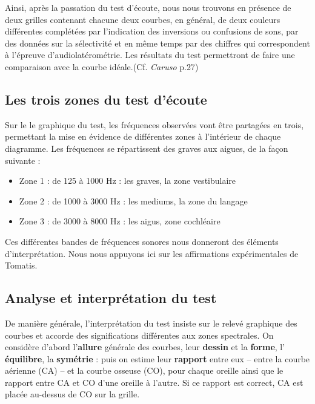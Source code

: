               Ainsi, après la passation du test d\textquoteright écoute, nous nous
trouvons en présence de deux grilles contenant chacune deux courbes,
en général, de deux couleurs différentes complétées par l'indication
des inversions ou confusions de sons, par des données sur la sélectivité
et en même temps par des chiffres qui correspondent à l'épreuve d'audiolatérométrie.
Les résultats du test permettront de faire une comparaison avec la
courbe idéale.(Cf.\textit{ Caruso }p.27)


\subsection{Les trois zones du test d'écoute }
Sur le le graphique du test, les fréquences observées vont être partagées en
trois, permettant la mise en évidence de différentes zones à l\textquoteright intérieur
de chaque diagramme. Les fréquences se répartissent des
graves aux aigues, de la façon suivante :
\begin{itemize}
\item Zone 1 : de 125 à 1000 Hz : les graves, la zone vestibulaire
\item Zone 2 : de 1000 à 3000 Hz : les mediums, la zone du langage
\item Zone 3 : de 3000 à 8000 Hz : les aigus, zone cochléaire
\end{itemize}
Ces différentes bandes de fréquences sonores nous donneront des éléments
d'interprétation.
Nous nous appuyons ici sur les affirmations expérimentales de Tomatis.

\subsection {Analyse et interprétation du test}


De manière générale, l'interprétation du test insiste sur le relevé graphique
des
courbes et accorde des
significations différentes aux zones spectrales.
On considère d'abord l'\textbf{allure }générale des courbes, leur
\textbf{dessin} et la \textbf{forme}, l' \textbf{équilibre}, la \textbf{symétrie}  :
puis on estime
leur\textbf{ rapport} entre eux -- entre la courbe aérienne (CA) -- et la courbe osseuse (CO),
pour chaque oreille ainsi que le rapport entre CA et CO d\textquoteright une
oreille à l'autre. Si ce rapport est correct, CA est placée au-dessus
de CO sur la grille.

